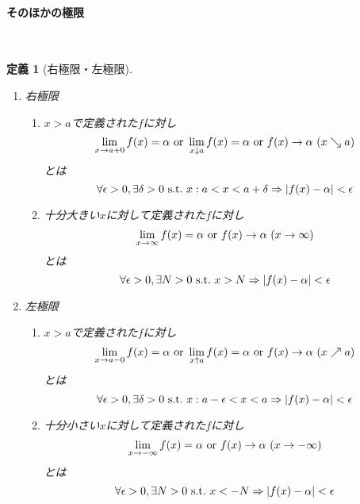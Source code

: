 \documentclass[dvipdfmx,a4j,10pt]{jsarticle}
\theoremstyle{mystyle1}
\newtheorem{dfn}{定義}[part]
\theoremstyle{mystyle2}
\begin{document}
\newpage

\paragraph{そのほかの極限}
　
\begin{framed}
    \begin{dfn}[右極限・左極限]　
        \begin{enumerate}
        \renewcommand{\labelenumi}{\Roman{enumi}.}
        \item 右極限
            \begin{enumerate}
            \renewcommand{\labelenumii}{\arabic{enumii}.}
            \item $x>a$で定義された$f$に対し
            \[
            \lim_{x\to a+0} f(x)=\alpha \ {\rm or}\ \lim_{x\downarrow a}f(x)=\alpha \ {\rm or} \ f(x)\to\alpha\ (x\searrow a)
            \]
            とは
            \[
            \forall\epsilon>0,\exists\delta>0\ {\rm s.t.}\ x:a<x<a+\delta \Rightarrow |f(x)-\alpha|<\epsilon
            \]

            \item 十分大きい$x$に対して定義された$f$に対し
            \[
            \lim_{x\to\infty}f(x)=\alpha\ {\rm or}\ f(x)\to\alpha\ (x\to \infty)
            \]
            とは
            \[
            \forall\epsilon>0,\exists N>0\ {\rm s.t.}\ x>N\Rightarrow |f(x)-\alpha|<\epsilon
            \]
            \end{enumerate}
        \item 左極限
            \begin{enumerate}
            \renewcommand{\labelenumii}{\arabic{enumii}.}
            \item $x>a$で定義された$f$に対し
            \[
            \lim_{x\to a-0} f(x)=\alpha \ {\rm or}\ \lim_{x\uparrow a}f(x)=\alpha \ {\rm or} \ f(x)\to\alpha\ (x\nearrow a)
            \]
            とは
            \[
            \forall\epsilon>0,\exists\delta>0\ {\rm s.t.}\ x:a-\epsilon<x<a \Rightarrow |f(x)-\alpha|<\epsilon
            \]
            \item 十分小さい$x$に対して定義された$f$に対し
            \[
            \lim_{x\to-\infty}f(x)=\alpha\ {\rm or}\ f(x)\to\alpha\ (x\to -\infty)
            \]
            とは
            \[
            \forall\epsilon>0,\exists N>0\ {\rm s.t.}\ x<-N\Rightarrow |f(x)-\alpha|<\epsilon
            \]
            \end{enumerate}
        \end{enumerate}
    \end{dfn}
\end{framed}
\end{document}
